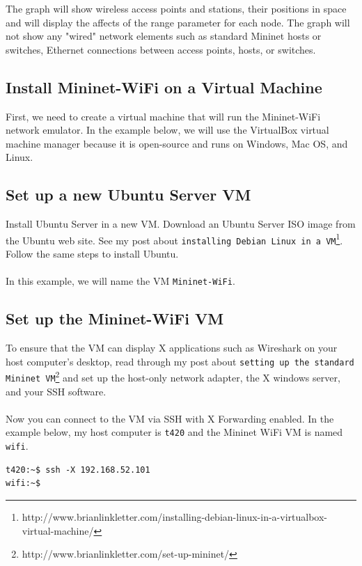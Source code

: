 The graph will show wireless access points and stations, their positions in space and will display the affects of the range parameter for each node. The graph will not show any "wired" network elements such as standard Mininet hosts or switches, Ethernet connections between access points, hosts, or switches.

\subsection{Install Mininet-WiFi on a Virtual Machine}

First, we need to create a virtual machine that will run the Mininet-WiFi network emulator. In the example below, we will use the VirtualBox virtual machine manager because it is open-source and runs on Windows, Mac OS, and Linux.

\subsection{Set up a new Ubuntu Server VM}

Install Ubuntu Server in a new VM. Download an Ubuntu Server ISO image from the Ubuntu web site. See my post about \texttt{installing Debian Linux in a VM}\footnote{http://www.brianlinkletter.com/installing-debian-linux-in-a-virtualbox-virtual-machine/}. Follow the same steps to install Ubuntu.
\\
\\
In this example, we will name the VM \texttt{Mininet-WiFi}.

\subsection{Set up the Mininet-WiFi VM}

To ensure that the VM can display X applications such as Wireshark on your host computer's desktop, read through my post about \texttt{setting up the standard Mininet VM}\footnote{http://www.brianlinkletter.com/set-up-mininet/} and set up the host-only network adapter, the X windows server, and your SSH software.
\\
\\
Now you can connect to the VM via SSH with X Forwarding enabled. In the example below, my host computer is \texttt{t420} and the Mininet WiFi VM is named \texttt{wifi}.

\begin{verbatim}
t420:~$ ssh -X 192.168.52.101
wifi:~$
\end{verbatim}

